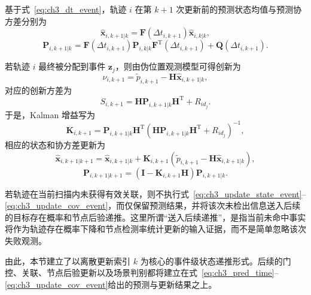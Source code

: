 \documentclass{xdupgthesis}
\begin{document}
基于式~\eqref{eq:ch3_dt_event}，轨迹 $i$ 在第 $k+1$ 次更新前的预测状态均值与预测协方差分别为
\begin{equation}
	\hat{\mathbf x}_{i,k+1|k}
	=
	\mathbf F(\Delta t_{i,k+1})\hat{\mathbf x}_{i,k|k},
	\label{eq:ch3_predict_state_event}
\end{equation}
\begin{equation}
	\mathbf P_{i,k+1|k}
	=
	\mathbf F(\Delta t_{i,k+1})
	\mathbf P_{i,k|k}
	\mathbf F^{\mathrm T}(\Delta t_{i,k+1})
	+
	\mathbf Q(\Delta t_{i,k+1}).
	\label{eq:ch3_predict_cov_event}
\end{equation}

若轨迹 $i$ 最终被分配到事件 $\mathbf z_j$，则由伪位置观测模型可得创新为
\begin{equation}
	\nu_{i,k+1}
	=
	\tilde p_{i,k+1}-\mathbf H\hat{\mathbf x}_{i,k+1|k},
	\label{eq:ch3_innovation_event}
\end{equation}
对应的创新方差为
\begin{equation}
	S_{i,k+1}
	=
	\mathbf H\mathbf P_{i,k+1|k}\mathbf H^{\mathrm T}
	+
	R_{id_j}.
	\label{eq:ch3_S_event}
\end{equation}
于是，Kalman 增益写为
\begin{equation}
	\mathbf K_{i,k+1}
	=
	\mathbf P_{i,k+1|k}\mathbf H^{\mathrm T}
	\left(
	\mathbf H\mathbf P_{i,k+1|k}\mathbf H^{\mathrm T}
	+
	R_{id_j}
	\right)^{-1},
	\label{eq:ch3_K_event}
\end{equation}
相应的状态和协方差更新为
\begin{equation}
	\hat{\mathbf x}_{i,k+1|k+1}
	=
	\hat{\mathbf x}_{i,k+1|k}
	+
	\mathbf K_{i,k+1}
	\left(
	\tilde p_{i,k+1}
	-
	\mathbf H\hat{\mathbf x}_{i,k+1|k}
	\right),
	\label{eq:ch3_update_state_event}
\end{equation}
\begin{equation}
	\mathbf P_{i,k+1|k+1}
	=
	\left(
	\mathbf I-\mathbf K_{i,k+1}\mathbf H
	\right)
	\mathbf P_{i,k+1|k}.
	\label{eq:ch3_update_cov_event}
\end{equation}

若轨迹在当前扫描内未获得有效关联，则不执行式~\eqref{eq:ch3_update_state_event}--\eqref{eq:ch3_update_cov_event}，而仅保留预测结果，并将该次未检出信息送入后续的目标存在概率和节点后验递推。这里所谓“送入后续递推”，是指当前未命中事实将作为轨迹存在概率下降和节点检测率统计更新的输入证据，而不是简单忽略该次失败观测。

由此，本节建立了以离散更新索引 $k$ 为核心的事件级状态递推形式。后续的门控、关联、节点后验更新以及场景判别都将建立在式~\eqref{eq:ch3_pred_time}--\eqref{eq:ch3_update_cov_event}给出的预测与更新结果之上。
\end{document}

